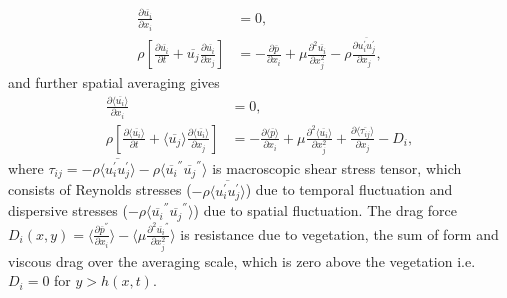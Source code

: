 \documentclass[12pt]{report}   %
\renewcommand{\bar}{\overline}
\begin{document}
 \begin{equation}
 \begin{split}
 \frac{\partial \bar{u_i} }{\partial x_i} &=0, \\
 \rho \left[ \frac{\partial  \overline{u_i}  }{\partial t}+  \overline{u_j}  \frac{\partial  \overline{u_i} }{\partial x_j} \right ] &= -\frac{\partial  \bar{p}   }{\partial x_i} + \mu \frac{\partial^2  \overline{u_i}  }{\partial x_j^2} - \rho \frac{\partial  \overline { u_i^{'} u_j^{'} }  }{\partial x_j}, 
 \end{split}
 \end{equation}
 and further spatial averaging gives
  \begin{equation}\label{averaged_eq}
  \begin{split}
  \frac{\partial \langle \bar{u_i} \rangle}{\partial x_i}&=0, \\
 \rho \left[ \frac{\partial \langle \overline{u_i} \rangle }{\partial t}+ \langle \overline{u_j} \rangle \frac{\partial \langle \bar{u_i} \rangle}{\partial x_j} \right ] &= -\frac{\partial \langle \bar{p} \rangle  }{\partial x_i} + \mu \frac{\partial^2 \langle \bar{u_i} \rangle }{\partial         x_j^2} + \frac{\partial \langle \bar{\tau_{ij}} \rangle }{\partial x_j} -D_i,
 \end{split}
 \end{equation}
 where $\tau_{ij}=-\rho \langle \overline{u_i^{'} u_j^{'}} \rangle  -\rho \langle{ \overline{u_i}^{''} \overline{u_j}^{''} } \rangle  $ is macroscopic shear stress tensor, which consists of Reynolds stresses ($ -\rho \langle \overline {u_i^{'} u_j^{'}} \rangle $) due to temporal fluctuation and dispersive stresses ($ -\rho \langle{ \overline{u_i}^{''} \overline{u_j}^{''} } \rangle $) due to spatial fluctuation. The drag force $D_i(x,y) = \langle \frac{\partial \overline{p}^{''}}{\partial x_i} \rangle - \langle \mu \frac{\partial^2 \bar{u_i}^{''} }{\partial x_j^2} \rangle $ is resistance due to vegetation, the sum of form and viscous drag over the averaging scale, which is zero above the vegetation i.e. $D_i = 0 $ for $y>h(x,t)$. 
 
\end{document}
